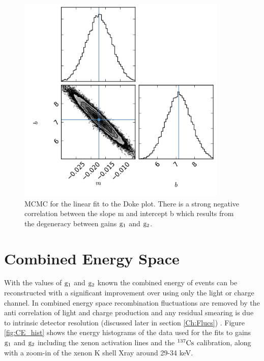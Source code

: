\begin{figure}[h!]\centering
\includegraphics[width=100mm]{Chapter_E_Scale/Figures/MCMC/triangle.png} %
\caption{MCMC for the linear fit to the Doke plot. There is a strong negative correlation between the slope m and intercept b which results from the degeneracy between gains $\rm g_1$ and $\rm g_2$. }
\label{fig:MCMC} 
\end{figure}

\newpage

\section{Combined Energy Space}

With the values of $\rm g_1$ and $\rm g_2$ known the combined energy of events can be reconstructed with a significant improvement over using only the light or charge channel. In combined energy space recombination fluctuations are removed by the anti correlation of light and charge production and any residual smearing is due to intrinsic detector resolution (discussed later in section \ref{Ch:Flucs}) . Figure \ref{fig:CE_hist} shows the energy histograms of the data used for the fits to gains $\rm g_1$ and $\rm g_2$ including the xenon activation lines and the $\rm^{137}Cs$ calibration, along with a zoom-in of the xenon K shell Xray around 29-34 keV. 


